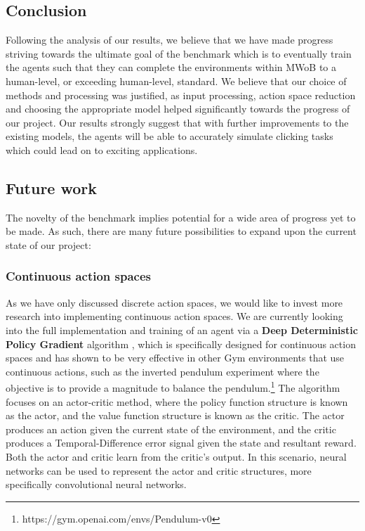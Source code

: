 \documentclass[10pt,journal,compsoc]{IEEEtran}
\begin{document}
\subsection{Conclusion}
Following the analysis of our results, we believe that we have made progress striving towards the ultimate goal of the benchmark which is to eventually train the agents such that they can complete the environments within MWoB to a human-level, or exceeding human-level, standard. We believe that our choice of methods and processing was justified, as input processing, action space reduction and choosing the appropriate model helped significantly towards the progress of our project. Our results strongly suggest that with further improvements to the existing models, the agents will be able to accurately simulate clicking tasks which could lead on to exciting applications. 
 
\subsection{Future work}
The novelty of the benchmark implies potential for a wide area of progress yet to be made. As such, there are many future possibilities to expand upon the current state of our project:
\subsubsection{Continuous action spaces}
As we have only discussed discrete action spaces, we would like to invest more research into implementing continuous action spaces. We are currently looking into the full implementation and training of an agent via a \textbf{Deep Deterministic Policy Gradient} algorithm \cite{lillicrap2015continuous}, which is specifically designed for continuous action spaces and has shown to be very effective in other Gym environments that use continuous actions, such as the inverted pendulum experiment %
where the objective is to provide a magnitude to balance the pendulum.\footnote[3]{https://gym.openai.com/envs/Pendulum-v0} The algorithm focuses on an actor-critic method, where the policy function structure is known as the actor, and the value function structure is known as the critic. The actor produces an action given the current state of the environment, and the critic produces a Temporal-Difference error signal given the state and resultant reward. Both the actor and critic learn from the critic's output. In this scenario, neural networks can be used to represent the actor and critic structures, more specifically convolutional neural networks.
\end{document}
